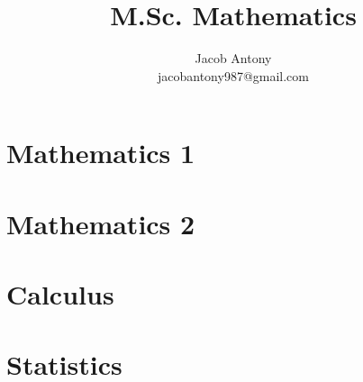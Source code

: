 \documentclass[a4paper,12pt,openany]{book}
\title{M.Sc. Mathematics}
\author{Jacob Antony\\jacobantony987@gmail.com}
\begin{document}
\tableofcontents
\part{Mathematics 1}



\part{Mathematics 2}





\part{Calculus}







\part{Statistics}





\end{document}
